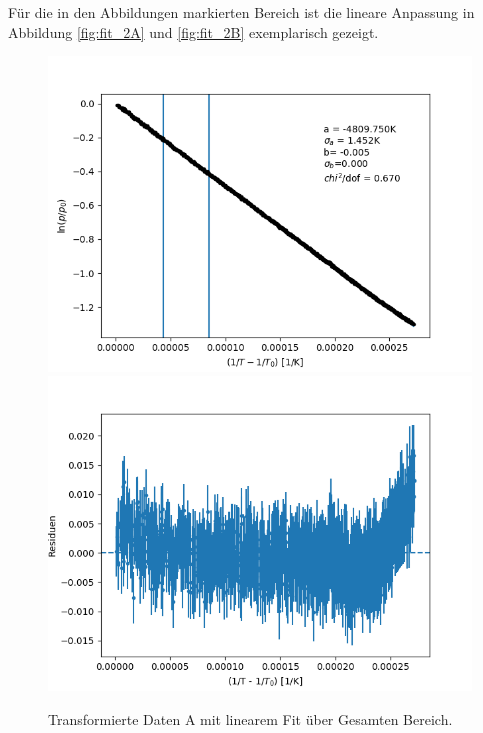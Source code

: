 \documentclass[12pt,a4paper]{article}
\begin{document}
Für die in den Abbildungen  markierten Bereich ist die lineare Anpassung in Abbildung \ref{fig:fit_2A} und \ref{fig:fit_2B} exemplarisch gezeigt.\\

\begin{figure}[H]
\begin{center}
\includegraphics[width=0.75\linewidth]{Bilder/log_RohdatenA}
\includegraphics[width=0.75\linewidth]{Bilder/residuen_gesamt_A}
\caption[Rohdaten logarith. A]{Transformierte Daten A mit linearem Fit über Gesamten Bereich.}
\label{fig:logA}
\end{center}
\end{figure}
\end{document}
